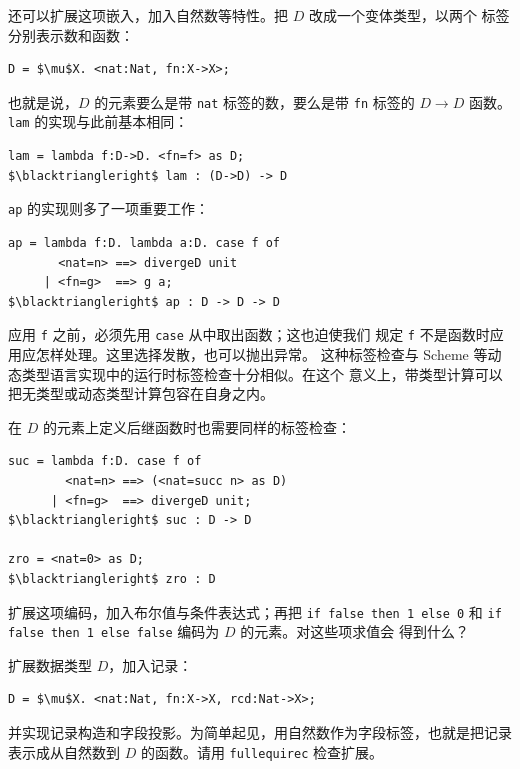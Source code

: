 
还可以扩展这项嵌入，加入自然数等特性。把 \(D\) 改成一个变体类型，以两个
标签分别表示数和函数：
\begin{lstlisting}[mathescape=true]
D = $\mu$X. <nat:Nat, fn:X->X>;
\end{lstlisting}
也就是说，\(D\) 的元素要么是带 \texttt{nat} 标签的数，要么是带
\texttt{fn} 标签的 \(D\to D\) 函数。\texttt{lam} 的实现与此前基本相同：
\begin{lstlisting}[mathescape=true]
lam = lambda f:D->D. <fn=f> as D;
$\blacktriangleright$ lam : (D->D) -> D
\end{lstlisting}
\texttt{ap} 的实现则多了一项重要工作：
\begin{lstlisting}[mathescape=true]
ap = lambda f:D. lambda a:D. case f of
       <nat=n> ==> divergeD unit
     | <fn=g>  ==> g a;
$\blacktriangleright$ ap : D -> D -> D
\end{lstlisting}
应用 \texttt{f} 之前，必须先用 \texttt{case} 从中取出函数；这也迫使我们
规定 \texttt{f} 不是函数时应用应怎样处理。这里选择发散，也可以抛出异常。
这种标签检查与 Scheme 等动态类型语言实现中的运行时标签检查十分相似。在这个
意义上，带类型计算可以把无类型或动态类型计算包容在自身之内。

在 \(D\) 的元素上定义后继函数时也需要同样的标签检查：
\begin{lstlisting}[mathescape=true]
suc = lambda f:D. case f of
        <nat=n> ==> (<nat=succ n> as D)
      | <fn=g>  ==> divergeD unit;
$\blacktriangleright$ suc : D -> D

zro = <nat=0> as D;
$\blacktriangleright$ zro : D
\end{lstlisting}

\begin{exercise}[\(\star\)]
\label{ex:20.1.4}
扩展这项编码，加入布尔值与条件表达式；再把
\texttt{if false then 1 else 0} 和
\texttt{if false then 1 else false} 编码为 \(D\) 的元素。对这些项求值会
得到什么？
\end{exercise}

\begin{exercise}
\label{ex:20.1.5}
扩展数据类型 \(D\)，加入记录：
\begin{lstlisting}[mathescape=true]
D = $\mu$X. <nat:Nat, fn:X->X, rcd:Nat->X>;
\end{lstlisting}
并实现记录构造和字段投影。为简单起见，用自然数作为字段标签，也就是把记录
表示成从自然数到 \(D\) 的函数。请用 \texttt{fullequirec} 检查扩展。
\end{exercise}

